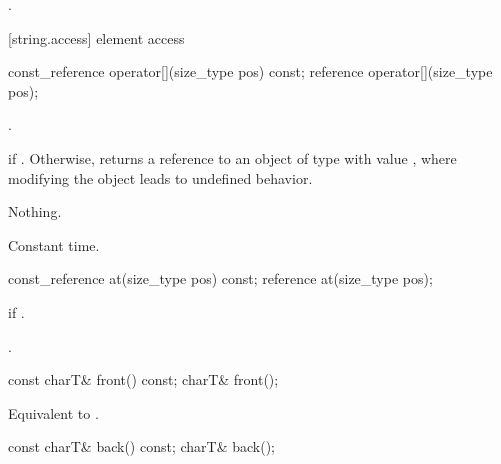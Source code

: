 \begin{itemdescr}
\pnum
\returns
{}.
\end{itemdescr}

[string.access]{ element access}

%
%
\begin{itemdecl}
const_reference operator[](size_type pos) const;
reference       operator[](size_type pos);
\end{itemdecl}

\begin{itemdescr}
\pnum
\requires {}.

\pnum
\returns {} if . Otherwise,
returns a reference to an object of type  with value
, where modifying the object leads to
undefined behavior.

\pnum
\throws Nothing.

\pnum
\complexity Constant time.
\end{itemdescr}

%
%
\begin{itemdecl}
const_reference at(size_type pos) const;
reference       at(size_type pos);
\end{itemdecl}

\begin{itemdescr}
\pnum
\throws
{}
if
.

\pnum
\returns
{}.
\end{itemdescr}

%
%
\begin{itemdecl}
const charT& front() const;
charT& front();
\end{itemdecl}

\begin{itemdescr}
\pnum
\requires
{}

\pnum
\effects
Equivalent to .
\end{itemdescr}

%
%
\begin{itemdecl}
const charT& back() const;
charT& back();
\end{itemdecl}

